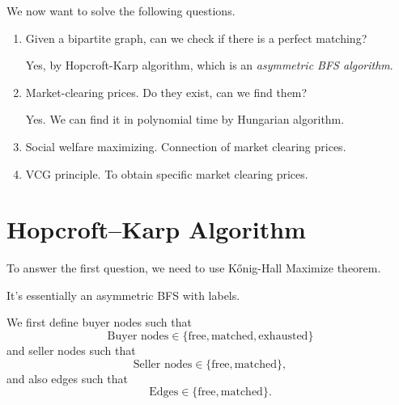 \begin{problem}
We now want to solve the following questions.
\begin{enumerate}
	\item Given a bipartite graph, can we check if there is a perfect matching?
	      \begin{answer}
		      Yes, by Hopcroft-Karp algorithm, which is an \emph{asymmetric BFS algorithm}.
	      \end{answer}
	\item Market-clearing prices. Do they exist, can we find them?
	      \begin{answer}
		      Yes. We can find it in polynomial time by Hungarian algorithm.
	      \end{answer}
	\item Social welfare maximizing. Connection of market clearing prices.
	\item VCG principle. To obtain specific market clearing prices.
\end{enumerate}
\end{problem}

\section{Hopcroft–Karp Algorithm}
\label{Hopcroft-Karp Algorithm}
To answer the first question, we need to use Kőnig-Hall Maximize theorem.
\begin{intuition}
	It's essentially an asymmetric BFS with labels.
\end{intuition}

We first define buyer nodes such that
\[
	\text{Buyer nodes}\in \{\text{free}, \text{matched}, \text{exhausted}   \}
\]
and seller nodes such that
\[
	\text{Seller nodes}\in \{\text{free}, \text{matched}\},
\]
and also edges such that
\[
	\text{Edges}\in \{\text{free}, \text{matched}\}.
\]

